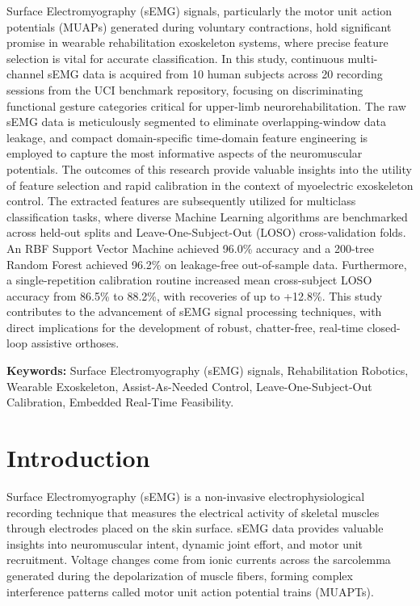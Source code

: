 \documentclass[12pt,a4paper]{article}
\begin{document}
Surface Electromyography (sEMG) signals, particularly the motor unit action potentials (MUAPs) generated during voluntary contractions, hold significant promise in wearable rehabilitation exoskeleton systems, where precise feature selection is vital for accurate classification. In this study, continuous multi-channel sEMG data is acquired from 10 human subjects across 20 recording sessions from the UCI benchmark repository, focusing on discriminating functional gesture categories critical for upper-limb neurorehabilitation. The raw sEMG data is meticulously segmented to eliminate overlapping-window data leakage, and compact domain-specific time-domain feature engineering is employed to capture the most informative aspects of the neuromuscular potentials. The outcomes of this research provide valuable insights into the utility of feature selection and rapid calibration in the context of myoelectric exoskeleton control. The extracted features are subsequently utilized for multiclass classification tasks, where diverse Machine Learning algorithms are benchmarked across held-out splits and Leave-One-Subject-Out (LOSO) cross-validation folds. An RBF Support Vector Machine achieved 96.0\% accuracy and a 200-tree Random Forest achieved 96.2\% on leakage-free out-of-sample data. Furthermore, a single-repetition calibration routine increased mean cross-subject LOSO accuracy from 86.5\% to 88.2\%, with recoveries of up to +12.8\%. This study contributes to the advancement of sEMG signal processing techniques, with direct implications for the development of robust, chatter-free, real-time closed-loop assistive orthoses.

\vspace{0.4em}
\noindent\textbf{Keywords:} Surface Electromyography (sEMG) signals, Rehabilitation Robotics, Wearable Exoskeleton, Assist-As-Needed Control, Leave-One-Subject-Out Calibration, Embedded Real-Time Feasibility.

\vspace{0.8em}
\section{Introduction}\label{sec:introduction}

Surface Electromyography (sEMG) is a non-invasive electrophysiological recording technique that measures the electrical activity of skeletal muscles through electrodes placed on the skin surface. sEMG data provides valuable insights into neuromuscular intent, dynamic joint effort, and motor unit recruitment. Voltage changes come from ionic currents across the sarcolemma generated during the depolarization of muscle fibers, forming complex interference patterns called motor unit action potential trains (MUAPTs).
\end{document}
